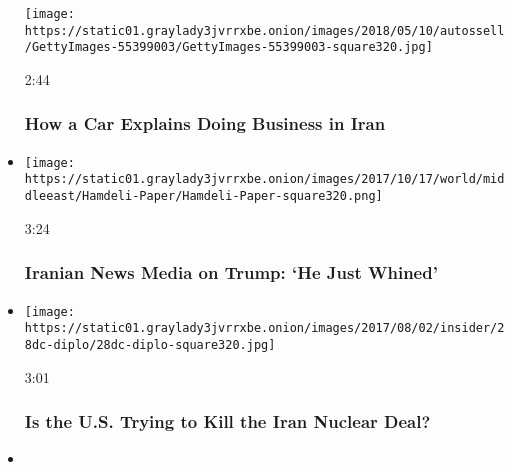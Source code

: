 \begin{itemize}
  \texttt{[image: https://static01.graylady3jvrrxbe.onion/images/2018/05/10/autossell/GettyImages-55399003/GettyImages-55399003-square320.jpg]}

  2:44

  \hypertarget{how-a-car-explains-doing-business-in-iran}{%
  \subsubsection{How a Car Explains Doing Business in
  Iran}\label{how-a-car-explains-doing-business-in-iran}}
\item
  \href{https://www.nytimes3xbfgragh.onion/video/world/middleeast/100000005498619/trump-iran-reactions-nuclear-deal.html?action=click\&module=video-series-bar\&region=header\&pgtype=Article\&playlistId=video/us-iran-relations}{}

  \texttt{[image: https://static01.graylady3jvrrxbe.onion/images/2017/10/17/world/middleeast/Hamdeli-Paper/Hamdeli-Paper-square320.png]}

  3:24

  \hypertarget{iranian-news-media-on-trump-he-just-whined}{%
  \subsubsection{Iranian News Media on Trump: `He Just
  Whined'}\label{iranian-news-media-on-trump-he-just-whined}}
\item
  \href{https://www.nytimes3xbfgragh.onion/video/us/politics/100000005317472/us-iran-nuclear-deal-sanctions.html?action=click\&module=video-series-bar\&region=header\&pgtype=Article\&playlistId=video/us-iran-relations}{}

  \texttt{[image: https://static01.graylady3jvrrxbe.onion/images/2017/08/02/insider/28dc-diplo/28dc-diplo-square320.jpg]}

  3:01

  \hypertarget{is-the-us-trying-to-kill-the-iran-nuclear-deal}{%
  \subsubsection{Is the U.S. Trying to Kill the Iran Nuclear
  Deal?}\label{is-the-us-trying-to-kill-the-iran-nuclear-deal}}
\item
  \href{https://www.nytimes3xbfgragh.onion/video/world/middleeast/100000005289800/irans-nuclear-deal-mohammad-zarif.html?action=click\&module=video-series-bar\&region=header\&pgtype=Article\&playlistId=video/us-iran-relations}{}


\end{itemize}
